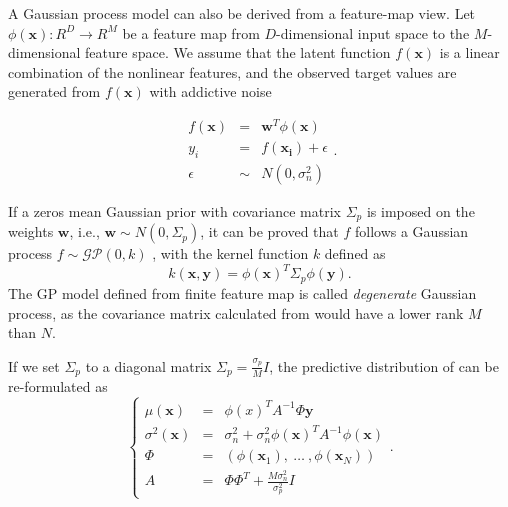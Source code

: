 A Gaussian process model can also be derived from a feature-map view. Let $\phi(\bm{x}): R^D \rightarrow R^M$ be a feature map from $D$-dimensional input space to the $M$-dimensional feature space. We assume that the latent function $f(\bm{x})$ is a linear combination of the nonlinear features, and the observed target values are generated from $f(\bm{x})$ with addictive noise

\begin{equation}
    \label{eq:weightspace}
    \begin{array}{lll}
        f(\bm{x}) &=&    \bm{w}^T \phi(\bm{x})   \\
        y_i       &=&    f(\bm{x_i}) + \epsilon  \\
        \epsilon  &\sim& N(0, \sigma_n^2)
    \end{array}.
\end{equation}

If a zeros mean Gaussian prior with covariance matrix $\Sigma_p$ is imposed on the weights $\bm{w}$, i.e., $\bm{w} \sim N(0, \Sigma_p)$, it can be proved that $f$ follows a Gaussian process $f \sim \mathcal{GP}(0, k)$ \cite{GPML}, with the kernel function $k$ defined as
\begin{equation}
    \label{eq:kernel_from_weight}
    k(\bm{x}, \bm{y}) = \phi(\bm{x})^T \Sigma_p \phi(\bm{y}).
\end{equation}
The GP model defined from finite feature map is called \emph{degenerate} Gaussian process, as the covariance matrix calculated from  would have a lower rank $M$ than $N$.


If we set $\Sigma_p$ to a diagonal matrix $\Sigma_p = \frac{\sigma_p}{M} I$, the predictive distribution of  can be re-formulated as
\begin{equation}
    \left\{
        \begin{array}{lll}
            \mu(\bm{x})      &= & \phi(x)^T A^{-1} \Phi \bm{y} \\
            \sigma^2(\bm{x}) &= & \sigma_n^2 + \sigma_n^2 \phi(\bm{x})^T A^{-1} \phi(\bm{x}) \\
            \Phi             &= & (\phi(\bm{x}_1),~\dots~,\phi(\bm{x}_N)) \\
            A                &= & \Phi \Phi^T + \frac{M \sigma_n^2}{\sigma_p^2} I
        \end{array}.
    \right.
    \label{eq:DegeneratePred}
\end{equation}

